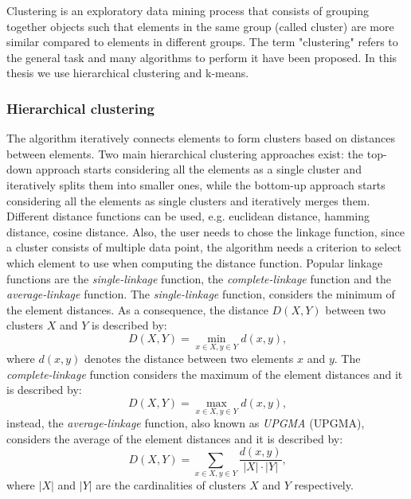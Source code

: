 Clustering is an exploratory data mining process that consists of grouping together objects such that elements in the same group (called cluster) are more similar compared to elements in different groups. The term "clustering" refers to the general task and many algorithms to perform it have been proposed. In this thesis we use hierarchical clustering and k-means.

\subsubsection*{Hierarchical clustering}

The algorithm iteratively connects elements to form clusters based on distances between elements. Two main hierarchical clustering approaches exist: the top-down approach starts considering all the elements as a single cluster and iteratively splits them into smaller ones, while the bottom-up approach starts considering all the elements as single clusters and iteratively merges them. Different distance functions can be used, e.g. euclidean distance, hamming distance, cosine distance. Also, the user needs to chose the linkage function, since a cluster consists of multiple data point, the algorithm needs a criterion to select which element to use when computing the distance function. Popular linkage functions are the \textit{single-linkage} function, the \textit{complete-linkage} function and the \textit{average-linkage} function. The \textit{single-linkage} function, considers the minimum of the element distances. As a consequence, the distance $D(X,Y)$ between two clusters $X$ and $Y$ is described by: 
\begin{equation}
 D(X,Y)= \min_{x\in X,y\in Y} d(x,y)  \text{,}
\end{equation}
 \label{eq:single_linkage}
 where $d(x,y)$ denotes the distance between two elements $x$ and $y$. The
\textit{complete-linkage} function considers the maximum of the element distances and it is described by:
\begin{equation}
 D(X,Y)=\max_{x\in X,y\in Y} d(x,y)  \text{,}
\end{equation}
\label{eq:complete_linkage}
instead, the \textit{average-linkage} function, also known as \textit{\acl{UPGMA}} (\acs{UPGMA}), considers the average of the element distances and it is described by:
\begin{equation}\label{eq:average_linkage}
    D(X,Y)=\sum_{x\in X,y\in Y} \frac{d(x,y)}{|X|\cdot|Y|}  \text{,}
\end{equation}
where $|X|$ and $|Y|$ are the cardinalities of clusters $X$ and $Y$ respectively.

